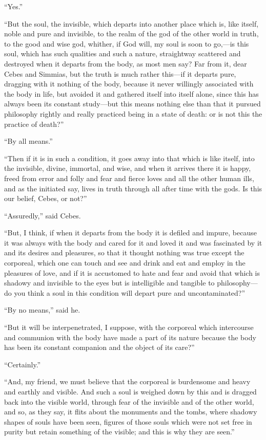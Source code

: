 \documentclass[letterpaper,12pt]{article}
\newcommand{\stephpag}[1]{\marginnote{\small\itshape\fontfamily{ppl}\selectfont #1}}
\begin{document}
\begin{drama}
``Yes.''
 
``But the soul, the invisible, which departs into another place which is, like itself, noble and pure and invisible, to the realm of the god of the other world in truth, to the good and wise god, whither, if God will, my soul is soon to go,---is this soul, which has such qualities and such a nature, straightway scattered and destroyed when it departs from the body, as most men say? \stephpag{e} Far from it, dear Cebes and Simmias, but the truth is much rather this---if it departs pure, dragging with it nothing of the body, because it never willingly associated with the body in life, but avoided it and gathered itself into itself alone, since this has always been its constant study---but this means nothing else than that it pursued philosophy rightly and \stephpag{81 a} really practiced being in a state of death: or is not this the practice of death?''
 
``By all means.''
 
``Then if it is in such a condition, it goes away into that which is like itself, into the invisible, divine, immortal, and wise, and when it arrives there it is happy, freed from error and folly and fear and fierce loves and all the other human ills, and as the initiated say, lives in truth through all after time with the gods. Is this our belief, Cebes, or not?''
 
``Assuredly,'' said Cebes.
 
``But, I think, \stephpag{b} if when it departs from the body it is defiled and impure, because it was always with the body and cared for it and loved it and was fascinated by it and its desires and pleasures, so that it thought nothing was true except the corporeal, which one can touch and see and drink and eat and employ in the pleasures of love, and if it is accustomed to hate and fear and avoid that which is shadowy and invisible to the eyes but is intelligible and tangible to philosophy---do you think a soul in this condition \stephpag{c} will depart pure and uncontaminated?''
 
``By no means,'' said he.
 
``But it will be interpenetrated, I suppose, with the corporeal which intercourse and communion with the body have made a part of its nature because the body has been its constant companion and the object of its care?''
 
``Certainly.''
 
``And, my friend, we must believe that the corporeal is burdensome and heavy and earthly and visible. And such a soul is weighed down by this and is dragged back into the visible world, through fear of the invisible and of the other world, and so, \stephpag{d} as they say, it flits about the monuments and the tombs, where shadowy shapes of souls have been seen, figures of those souls which were not set free in purity but retain something of the visible; and this is why they are seen.''
 

\end{drama}
\end{document}

